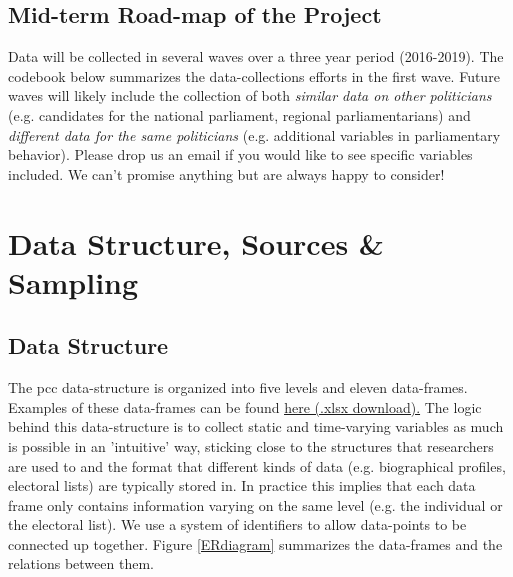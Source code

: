 \documentclass{article}
\begin{document}
\subsection{Mid-term Road-map of the Project}
Data will be collected in several waves over a three year period (2016-2019). The codebook below summarizes the data-collections efforts in the first wave. Future waves will likely include the collection of both\textit{ similar data on other politicians} (e.g. candidates for the national parliament, regional parliamentarians) and \textit{different data for the same politicians} (e.g. additional variables in parliamentary behavior). Please drop us an email if you would like to see specific variables included. We can't promise anything but are always happy to consider!

\section{Data Structure, Sources \& Sampling}

\subsection{Data Structure}
The \gls{pcc} data-structure is organized into five levels and eleven data-frames. Examples of these data-frames can be found \href{http://parliamentarycareersincomparison.org/wp-content/uploads/2017/03/PCC-example-data_v311.xlsx}{\underline{here} (.xlsx download).} The logic behind this data-structure is to collect static and time-varying variables as much is possible in an 'intuitive' way, sticking close to the structures that researchers are used to and the format that different kinds of data (e.g. biographical profiles, electoral lists) are typically stored in. In practice this implies that each data frame only contains information varying on the same level (e.g. the individual or the electoral list). We use a system of identifiers to allow data-points to be connected up together. Figure \ref{ERdiagram} summarizes the data-frames and the relations between them.
\end{document}
